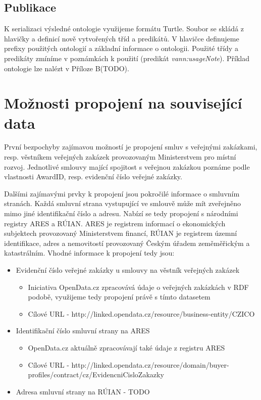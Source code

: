 \subsection{Publikace}

K serializaci výsledné ontologie využijeme formátu Turtle. Soubor se skládá z hlavičky a definicí nově vytvořených tříd a predikátů. V hlavičce definujeme prefixy použitých ontologií a základní informace o ontologii. Použité třídy a predikáty zmíníme v poznámkách k použití (predikát \textit{vann:usageNote}). Příklad ontologie lze nalézt v Příloze B(TODO).

\section{Možnosti propojení na související data}

První bezpochyby zajímavou možností je propojení smluv s veřejnými zakázkami, resp. věstníkem veřejných zakázek provozovaným Ministerstvem pro místní rozvoj. Jednotlivé smlouvy mající spojitost s veřejnou zakázkou poznáme podle vlastnosti AwardID, resp. evidenční číslo veřejné zakázky.  

Dalšími zajímavými prvky k propojení jsou pokročilé informace o smluvním stranách. Každá smluvní strana vystupující ve smlouvě může mít zveřejněno mimo jiné identifikační číslo a adresu. Nabízí se tedy propojení s národními registry ARES a RÚIAN. ARES je registrem informací o ekonomických subjektech provozovaný Ministerstvem financí, RÚIAN je registrem územní identifikace, adres a nemovitostí provozovaný Českým úřadem zeměměřickým a katastrálním. Vhodné informace k propojení tedy jsou:

\begin{itemize}
\item Evidenční číslo veřejné zakázky u smlouvy na věstník veřejných zakázek
	\begin{itemize}
	\item Iniciativa OpenData.cz zpracovává údaje o veřejných zakázkách v RDF podobě, využijeme tedy propojení právě s tímto datasetem 
	\item Cílové URL - http://linked.opendata.cz/resource/business-entity/CZ{ICO}
	\end{itemize}
\item Identifikační číslo smluvní strany na ARES
	\begin{itemize}
	\item OpenData.cz aktuálně zpracovávají také údaje z registru ARES
	\item Cílové URL - http://linked.opendata.cz/resource/domain/buyer-profiles/contract/cz/{EvidencniCisloZakazky}
	\end{itemize}
\item Adresa smluvní strany na RÚIAN - TODO
\end{itemize}

